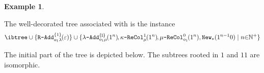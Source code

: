 \documentclass[10pt,a4paper]{amsart}
\theoremstyle{definition}
\newtheorem{exa}[exa]{Example}
\numberwithin{equation}{section}
\theoremstyle{plain}
\theoremstyle{definition}
\newtheorem{example}[example]{Example}
\theoremstyle{myexample}
\renewenvironment{example}%
{
	\begin{shaded*}	
		\vspace{-1.5ex}
		\begin{exa}%
		}{
		\end{exa}
		\vspace{-1.5ex}
	\end{shaded*}
}
\theoremstyle{plain}
\theoremstyle{definition}
\newcommand{\origcol}{o}
\newcommand{\newanon}{\pred{New}_{\const{*}}} %
\newcommand{\cadd}[4]{#4\pred{\texttt{-}Add}^{#3}_{#1#2}} %
\newcommand{\radd}[4]{#4\pred{\texttt{-}Add}^{#3}_{#1#2}}
\newcommand{\recol}[2]{#2\pred{\texttt{-}ReCol}_{#1}}
\newcommand{\pred}[1]{\mathtt{#1}}
\newcommand{\const}[1]{\mathtt{#1}}
\newcommand{\rpred}{\pred{R}}
\begin{document}

\begin{example}\label{ex:terntree}

The well-decorated tree associated with  is the instance %
\\[-4ex]

$$
\ibtree \cup \{\radd{\origcol_1}{\lambda}{\{1\}}{\rpred}\hspace{-1pt}(\varepsilon)\} \cup
\{\cadd{\origcol_1}{\mu}{\smash{\{\hspace{-1pt}1\hspace{-1pt}\}}}{\lambda}\hspace{-1pt}(1^n)\hspace{-1pt},
\recol{\mu}{\kappa}^1\hspace{-1pt}(1^n)\hspace{-1pt},
\recol{\origcol_{1}}{\mu}^0\hspace{-1pt}(1^n), \newanon(1^{n-1}0) \mid n {\in} \mathbb{N}^+\}
$$
\vspace{-1ex}

\noindent The initial part of the tree is depicted below. %
The subtrees rooted in $1$ and $11$ are isomorphic.

\vspace{-2.5ex}
\hspace{12ex}\scalebox{0.8}{
	\begin{tikzpicture}%
		[
		level 1/.style={sibling distance=60mm, level distance=12mm},
		level 2/.style={sibling distance=30mm, level distance=15mm},
		level 3/.style={sibling distance=14mm, level distance=10mm},
		]
		

\end{tikzpicture}}
\end{example}
\end{document}
